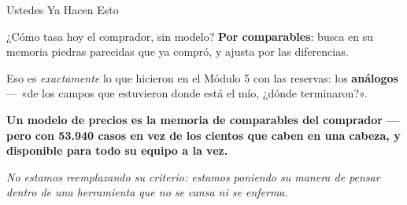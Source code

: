 \documentclass[aspectratio=169, 11pt]{beamer}
\begin{document}
\begin{frame}[shrink=5]{Ustedes Ya Hacen Esto}
  \vspace{4pt}
  {\footnotesize\color{textMuted}
   ¿Cómo tasa hoy el comprador, sin modelo? \textbf{Por comparables}: busca
   en su memoria piedras parecidas que ya compró, y ajusta por las
   diferencias.
   \vspace{6pt}

   Eso es \emph{exactamente} lo que hicieron en el Módulo 5 con las
   reservas: los \textbf{análogos} --- «de los campos que estuvieron donde
   está el mío, ¿dónde terminaron?».}
  \vspace{7pt}
  \begin{tcolorbox}[colback=arcaGray, colframe=arcaDark, boxrule=0pt,
    leftrule=4pt, arc=3pt, left=10pt, right=10pt, top=6pt, bottom=6pt]
    {\footnotesize\color{arcaDark}\bfseries
     Un modelo de precios es la memoria de comparables del comprador ---
     pero con 53.940 casos en vez de los cientos que caben en una cabeza,
     y disponible para todo su equipo a la vez.}
  \end{tcolorbox}
  \vspace{7pt}
  {\footnotesize\color{arcaDark}\itshape
   No estamos reemplazando su criterio: estamos poniendo su manera de
   pensar dentro de una herramienta que no se cansa ni se enferma.}
\end{frame}
\end{document}
